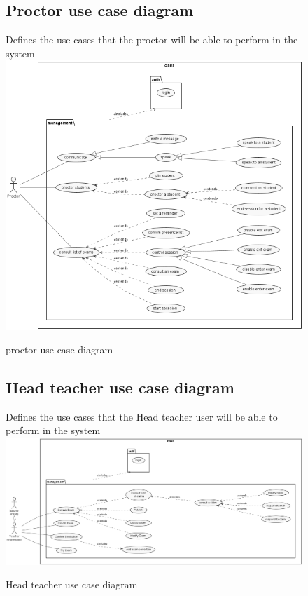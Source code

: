\documentclass[]{uc2pfecaneva}
\begin{document}
    \begin{figure}
        \subsection{Proctor use case diagram}
        Defines the use cases that the proctor will be able to perform in the system
        \centering
        \includegraphics[width=\textwidth]{images/proctor_UCD}
        \caption{proctor use case diagram}
    \end{figure}


    \begin{figure}
        \subsection{Head teacher use case diagram}
        Defines the use cases that the Head teacher user will be able to perform in the system
        \centering
        \includegraphics[width=450pt]{images/Module_Teacher}
        \caption{Head teacher use case diagram}
    \end{figure}
\end{document}
